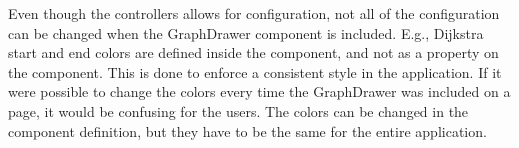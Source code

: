 Even though the controllers allows for configuration, not all of the configuration can be changed when the GraphDrawer component is included. E.g., Dijkstra start and end colors are defined inside the component, and not as a property on the component. This is done to enforce a consistent style in the application. If it were possible to change the colors every time the GraphDrawer was included on a page, it would be confusing for the users. The colors can be changed in the component definition, but they have to be the same for the entire application.










